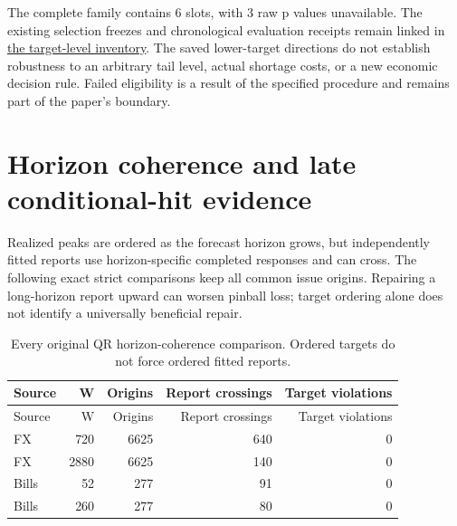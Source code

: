 \documentclass[11pt,a4paper]{article}
\begin{document}
The complete family contains 6 slots,
with 3 raw p values unavailable.
The existing selection freezes and chronological evaluation receipts remain
linked in \href{https://github.com/ByronLi0207/financial-mathematics-paper-20261020/blob/revision-v7-final/results/revision-20261023/v6/wp5-tau-summary.json}{the target-level inventory}.
The saved lower-target directions do not establish robustness to an arbitrary
tail level, actual shortage costs, or a new economic decision rule. Failed
eligibility is a result of the specified procedure and remains part of the
paper's boundary.\section{Horizon coherence and late conditional-hit evidence}\label{sup:coherence}

Realized peaks are ordered as the forecast horizon grows, but
independently fitted reports use horizon-specific completed responses and can
cross. The following exact strict comparisons keep all common issue origins.
Repairing a long-horizon report upward can worsen pinball loss; target ordering
alone does not identify a universally beneficial repair.
\begingroup
\small
\setlength{\tabcolsep}{3pt}
\renewcommand{\arraystretch}{1.12}
\begin{longtable}{lrrrr}
\caption{Every original QR horizon-coherence comparison. Ordered targets do not force ordered fitted reports.}\\
\toprule
Source & W & Origins & Report crossings & Target violations \\
\midrule
\endfirsthead
\toprule
Source & W & Origins & Report crossings & Target violations \\
\midrule
\endhead
\bottomrule
\endfoot
FX & 720 & 6625 & 640 & 0 \\
FX & 2880 & 6625 & 140 & 0 \\
Bills & 52 & 277 & 91 & 0 \\
Bills & 260 & 277 & 80 & 0 \\
\end{longtable}
\endgroup
\end{document}
